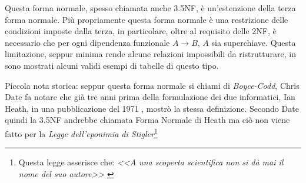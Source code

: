 Questa forma normale, spesso chiamata anche 3.5NF, è un'estenzione della terza forma normale. Più propriamente questa forma normale è una restrizione delle condizioni imposte dalla terza, in particolare, oltre al requisito delle 2NF, è necessario che per ogni dipendenza funzionale $A \rightarrow B$, $A$ sia superchiave. Questa limitazione, seppur minima rende alcune relazioni impossibili da ristrutturare, in \cite{wiki:bcnf} sono mostrati alcuni validi esempi di tabelle di questo tipo.

Piccola nota storica: seppur questa forma normale si chiami di \emph{Boyce-Codd}, Chris Date fa notare che già tre anni prima della formulazione dei due informatici, Ian Heath, in una pubblicazione del 1971 \cite{heath:bcnf}, mostrò la stessa definizione. Secondo Date quindi la 3.5NF andrebbe chiamata Forma Normale di Heath ma ciò non viene fatto per la \emph{Legge dell'eponimia di Stigler}\footnote{Questa legge asserisce che: \emph{<<A una scoperta scientifica non si dà mai il nome del suo autore>>} \cite{stigler} }